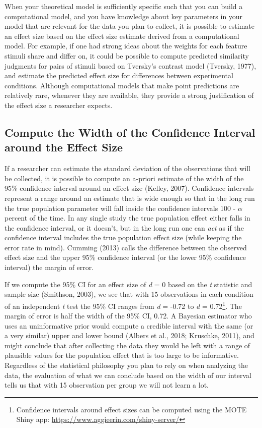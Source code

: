 \documentclass[
  english,
  ,jou, a4paper,floatsintext]{apa6}
\begin{document}
When your theoretical model is sufficiently specific such that you can build a computational model, and you have knowledge about key parameters in your model that are relevant for the data you plan to collect, it is possible to estimate an effect size based on the effect size estimate derived from a computational model. For example, if one had strong ideas about the weights for each feature stimuli share and differ on, it could be possible to compute predicted similarity judgments for pairs of stimuli based on Tversky's contrast model (Tversky, 1977), and estimate the predicted effect size for differences between experimental conditions. Although computational models that make point predictions are relatively rare, whenever they are available, they provide a strong justification of the effect size a researcher expects.

\hypertarget{compute-the-width-of-the-confidence-interval-around-the-effect-size}{%
\subsection{Compute the Width of the Confidence Interval around the Effect Size}\label{compute-the-width-of-the-confidence-interval-around-the-effect-size}}

If a researcher can estimate the standard deviation of the observations that will be collected, it is possible to compute an a-priori estimate of the width of the 95\% confidence interval around an effect size (Kelley, 2007). Confidence intervals represent a range around an estimate that is wide enough so that in the long run the true population parameter will fall inside the confidence intervals 100 - \(\alpha\) percent of the time. In any single study the true population effect either falls in the confidence interval, or it doesn't, but in the long run one can \emph{act} as if the confidence interval includes the true population effect size (while keeping the error rate in mind). Cumming (2013) calls the difference between the observed effect size and the upper 95\% confidence interval (or the lower 95\% confidence interval) the margin of error.

If we compute the 95\% CI for an effect size of \emph{d} = 0 based on the \emph{t} statistic and sample size (Smithson, 2003), we see that with 15 observations in each condition of an independent \emph{t} test the 95\% CI ranges from \emph{d} = -0.72 to \emph{d} = 0.72\footnote{Confidence intervals around effect sizes can be computed using the MOTE Shiny app: \url{https://www.aggieerin.com/shiny-server/}}. The margin of error is half the width of the 95\% CI, 0.72. A Bayesian estimator who uses an uninformative prior would compute a credible interval with the same (or a very similar) upper and lower bound (Albers et al., 2018; Kruschke, 2011), and might conclude that after collecting the data they would be left with a range of plausible values for the population effect that is too large to be informative. Regardless of the statistical philosophy you plan to rely on when analyzing the data, the evaluation of what we can conclude based on the width of our interval tells us that with 15 observation per group we will not learn a lot.
\end{document}
